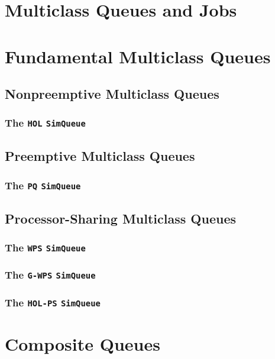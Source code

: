 \documentclass[12pt]{book}
\begin{document}
\chapter{Multiclass Queues and Jobs}

\chapter{Fundamental Multiclass Queues}

\section{Nonpreemptive Multiclass Queues}

\subsection{The \lstinline{HOL} \lstinline{SimQueue}}

\section{Preemptive Multiclass Queues}

\subsection{The \lstinline{PQ} \lstinline{SimQueue}}

\section{Processor-Sharing Multiclass Queues}

\subsection{The \lstinline{WPS} \lstinline{SimQueue}}

\subsection{The \lstinline{G-WPS} \lstinline{SimQueue}}

\subsection{The \lstinline{HOL-PS} \lstinline{SimQueue}}

\chapter{Composite Queues}
\end{document}
